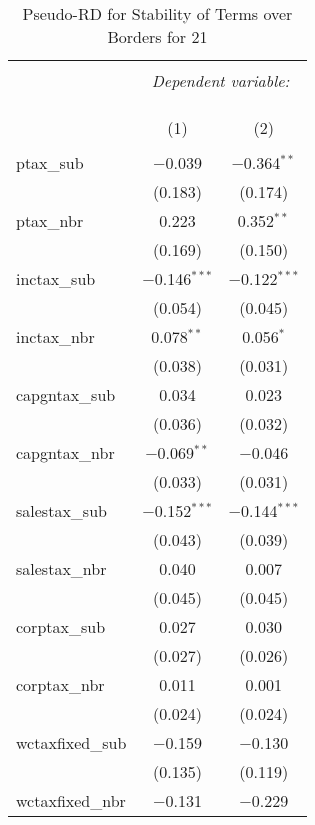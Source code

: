 
\begin{table}[!htbp] \centering 
  \caption{Pseudo-RD for Stability of Terms over Borders for  21} 
  \label{} 
\begin{tabular}{@{\extracolsep{5pt}}lcc} 
\\[-1.8ex]\hline 
\hline \\[-1.8ex] 
 & \multicolumn{2}{c}{\textit{Dependent variable:}} \\ 
\cline{2-3} 
\\[-1.8ex] & \multicolumn{2}{c}{ } \\ 
\\[-1.8ex] & (1) & (2)\\ 
\hline \\[-1.8ex] 
 ptax\_sub & $-$0.039 & $-$0.364$^{**}$ \\ 
  & (0.183) & (0.174) \\ 
  ptax\_nbr & 0.223 & 0.352$^{**}$ \\ 
  & (0.169) & (0.150) \\ 
  inctax\_sub & $-$0.146$^{***}$ & $-$0.122$^{***}$ \\ 
  & (0.054) & (0.045) \\ 
  inctax\_nbr & 0.078$^{**}$ & 0.056$^{*}$ \\ 
  & (0.038) & (0.031) \\ 
  capgntax\_sub & 0.034 & 0.023 \\ 
  & (0.036) & (0.032) \\ 
  capgntax\_nbr & $-$0.069$^{**}$ & $-$0.046 \\ 
  & (0.033) & (0.031) \\ 
  salestax\_sub & $-$0.152$^{***}$ & $-$0.144$^{***}$ \\ 
  & (0.043) & (0.039) \\ 
  salestax\_nbr & 0.040 & 0.007 \\ 
  & (0.045) & (0.045) \\ 
  corptax\_sub & 0.027 & 0.030 \\ 
  & (0.027) & (0.026) \\ 
  corptax\_nbr & 0.011 & 0.001 \\ 
  & (0.024) & (0.024) \\ 
  wctaxfixed\_sub & $-$0.159 & $-$0.130 \\ 
  & (0.135) & (0.119) \\ 
  wctaxfixed\_nbr & $-$0.131 & $-$0.229 \\ 

\end{tabular}
\end{table}
